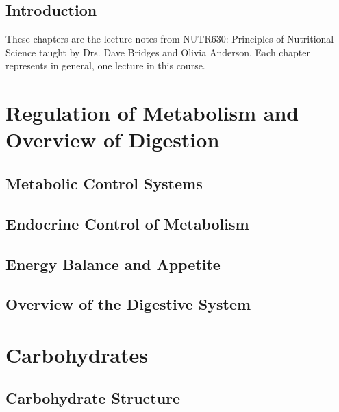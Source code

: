 \documentclass{tufte-book}
\begin{document}
\cleardoublepage
\chapter*{Introduction}\label{ch:introduction}

These chapters are the lecture notes from NUTR630: Principles of Nutritional Science taught by Drs. Dave Bridges and Olivia Anderson.  Each chapter represents in general, one lecture in this course.


\mainmatter

\part{Regulation of Metabolism and Overview of Digestion}
\chapter{Metabolic Control Systems}\label{ch:metabolic-control-systems}


\chapter{Endocrine Control of Metabolism}\label{ch:endocrine-control}


\chapter{Energy Balance and Appetite}\label{ch:energy-balance}


\chapter{Overview of the Digestive System}\label{ch:intro-digestion}


\part{Carbohydrates}

\chapter{Carbohydrate Structure}\label{ch:carb-structure}

\end{document}
